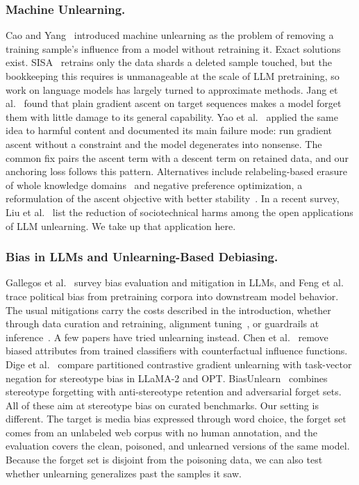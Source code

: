 \documentclass[runningheads]{llncs}
\begin{document}
\subsubsection{Machine Unlearning.}
Cao and Yang~\cite{cao2015towards} introduced machine unlearning as the
problem of removing a training sample's influence from a model without
retraining it. Exact solutions exist. SISA~\cite{bourtoule2021machine}
retrains only the data shards a deleted sample touched, but the
bookkeeping this requires is unmanageable at the scale of LLM
pretraining, so work on language models has largely turned to
approximate methods. Jang et al.~\cite{jang2023knowledge} found that
plain gradient ascent on target sequences makes a model forget them with
little damage to its general capability. Yao et al.~\cite{yao2024large}
applied the same idea to harmful content and documented its main failure
mode: run gradient ascent without a constraint and the model degenerates
into nonsense. The common fix pairs the ascent term with a descent term
on retained data, and our anchoring loss follows this pattern.
Alternatives include relabeling-based erasure of whole knowledge
domains~\cite{eldan2023whos} and negative preference optimization, a
reformulation of the ascent objective with better
stability~\cite{zhang2024negative}. In a recent survey, Liu et
al.~\cite{liu2025rethinking} list the reduction of sociotechnical harms
among the open applications of LLM unlearning. We take up that
application here.

\subsubsection{Bias in LLMs and Unlearning-Based Debiasing.}
Gallegos et al.~\cite{gallegos2024bias} survey bias evaluation and
mitigation in LLMs, and Feng et al.~\cite{feng2023pretraining} trace
political bias from pretraining corpora into downstream model behavior.
The usual mitigations carry the costs described in the introduction,
whether through data curation and retraining, alignment
tuning~\cite{ouyang2022training}, or guardrails at
inference~\cite{inan2023llamaguard}. A few papers have tried unlearning
instead. Chen et al.~\cite{chen2023fast} remove biased attributes from
trained classifiers with counterfactual influence functions. Dige et
al.~\cite{dige2024mitigating} compare partitioned contrastive gradient
unlearning with task-vector negation for stereotype bias in LLaMA-2 and
OPT. BiasUnlearn~\cite{liu2025bias} combines stereotype forgetting with
anti-stereotype retention and adversarial forget sets. All of these aim
at stereotype bias on curated benchmarks. Our setting is different. The
target is media bias expressed through word choice, the forget set comes
from an unlabeled web corpus with no human annotation, and the
evaluation covers the clean, poisoned, and unlearned versions of the
same model. Because the forget set is disjoint from the poisoning data,
we can also test whether unlearning generalizes past the samples it saw.
\end{document}
